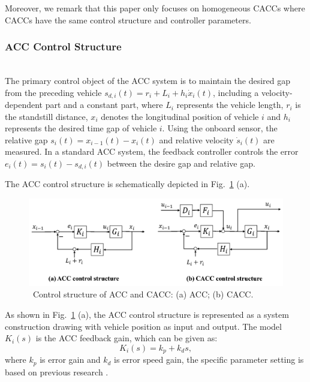 \documentclass[journal]{IEEEtran}
\begin{document}
Moreover, we remark that this paper only focuses on homogeneous CACCs where CACCs have the same control structure and controller parameters.


\subsubsection{ACC Control Structure}
\label{Section 2.3.1}
~\\

The primary control object of the ACC system is to maintain the desired gap from the preceding vehicle $s_{d, i}(t)=r_{i}+L_{i}+h_{i} \dot{x}_{i}(t)$, including a velocity-dependent part and a constant part, where $L_i$ represents the vehicle length, $r_i$ is the standstill distance, $x_i$ denotes the longitudinal position of vehicle $i$ and $h_i$ represents the desired time gap of vehicle $i$. Using the onboard sensor, the relative gap $s_{i}(t)=x_{i-1}(t)-x_{i}(t)$ and relative velocity $\dot{s}_{i} (t)$ are measured. In a standard ACC system, the feedback controller controls the error $e_{i}(t)=s_{i}(t)-s_{d, i}(t)$ between the desire gap and relative gap.

The ACC control structure is schematically depicted in Fig.~\ref{fig2} (a).

\begin{figure}
  \centering
  \includegraphics[width=12cm]{figs/fig2.png}
  \caption{~Control structure of ACC and CACC: (a) ACC; (b) CACC.}
  \label{fig2}
\end{figure}

As shown in Fig.~\ref{fig2} (a), the ACC control structure is represented as a system construction drawing with vehicle position as input and output. The model $K_i (s)$ is the ACC feedback gain, which can be given as:
\begin{equation}
  K_{i}(s)=k_{p}+k_{d} s,
\end{equation}
where $k_p$ is error gain and $k_d$ is error speed gain, the specific parameter setting is based on previous research \citep{milanes2014modeling,milanes2013cooperative}.
\end{document}

